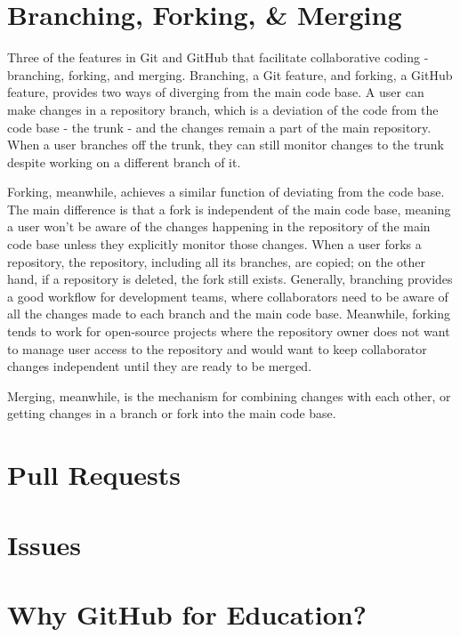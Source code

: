 \section{Branching, Forking, \& Merging}
Three of the features in Git and GitHub that facilitate collaborative coding - branching, forking, and merging. Branching, a Git feature, and forking, a GitHub feature, provides two ways of diverging from the main code base. A user can make changes in a repository branch, which is a deviation of the code from the code base - the trunk - and the changes remain a part of the main repository. When a user branches off the trunk, they can still monitor changes to the trunk despite working on a different branch of it.

Forking, meanwhile, achieves a similar function of deviating from the code base. The main difference is that a fork is independent of the main code base, meaning a user won't be aware of the changes happening in the repository of the main code base unless they explicitly monitor those changes. When a user forks a repository, the repository, including all its branches, are copied; on the other hand, if a repository is deleted, the fork still exists. Generally, branching provides a good workflow for development teams, where collaborators need to be aware of all the changes made to each branch and the main code base. Meanwhile, forking tends to work for open-source projects where the repository owner does not want to manage user access to the repository and would want to keep collaborator changes independent until they are ready to be merged.

Merging, meanwhile, is the mechanism for combining changes with each other, or getting changes in a branch or fork into the main code base. 

\section{Pull Requests}

\section{Issues}

\section{Why GitHub for Education?}
